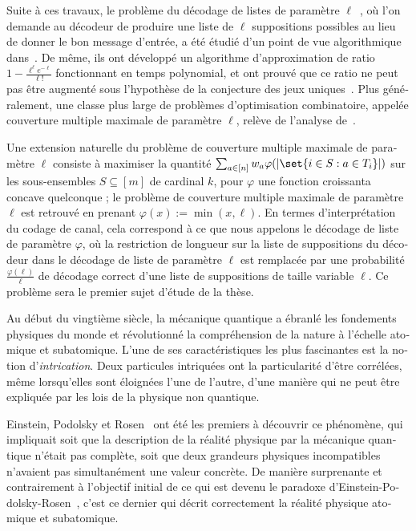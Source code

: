\begin{otherlanguage}{french}
Suite à ces travaux, le problème du décodage de listes de paramètre $\ell$~\cite{Elias57,Wozencraft58}, où l'on demande au décodeur de produire une liste de $\ell$ suppositions possibles au lieu de donner le bon message d'entrée, a été étudié d'un point de vue algorithmique dans~\cite{BFGG20}. De même, ils ont développé un algorithme d'approximation de ratio $1-\frac{\ell^{\ell}e^{-\ell}}{\ell!}$ fonctionnant en temps polynomial, et ont prouvé que ce ratio ne peut pas être augmenté sous l'hypothèse de la conjecture des jeux uniques~\cite{Khot02}. Plus généralement, une classe plus large de problèmes d'optimisation combinatoire, appelée couverture multiple maximale de paramètre $\ell$, relève de l'analyse de~\cite{BFGG20}.

Une extension naturelle du problème de couverture multiple maximale de paramètre $\ell$ consiste à maximiser la quantité $\sum_{a \in [n]} w_a\varphi(\abs{\set{i \in S : a \in T_i}})$ sur les sous-ensembles $S \subseteq [m]$ de cardinal $k$, pour $\varphi$ une fonction croissanta concave quelconque ; le problème de couverture multiple maximale de paramètre $\ell$ est retrouvé en prenant $\varphi(x) := \min(x,\ell)$. En termes d'interprétation du codage de canal, cela correspond à ce que nous appelons le décodage de liste de paramètre $\varphi$, où la restriction de longueur sur la liste de suppositions du décodeur dans le décodage de liste de paramètre $\ell$ est remplacée par une probabilité $\frac{\varphi(\ell)}{\ell}$ de décodage correct d'une liste de suppositions de taille variable $\ell$. Ce problème sera le premier sujet d'étude de la thèse.

Au début du vingtième siècle, la mécanique quantique a ébranlé les fondements physiques du monde et révolutionné la compréhension de la nature à l'échelle atomique et subatomique. L'une de ses caractéristiques les plus fascinantes est la notion d'\emph{intrication}. Deux particules intriquées ont la particularité d'être corrélées, même lorsqu'elles sont éloignées l'une de l'autre, d'une manière qui ne peut être expliquée par les lois de la physique non quantique.

Einstein, Podolsky et Rosen~\cite{EPR35} ont été les premiers à découvrir ce phénomène, qui impliquait soit que la description de la réalité physique par la mécanique quantique n'était pas complète, soit que deux grandeurs physiques incompatibles n'avaient pas simultanément une valeur concrète. De manière surprenante et contrairement à l'objectif initial de ce qui est devenu le paradoxe d'Einstein-Podolsky-Rosen~\cite{EPR35}, c'est ce dernier qui décrit correctement la réalité physique atomique et subatomique.


\end{otherlanguage}
